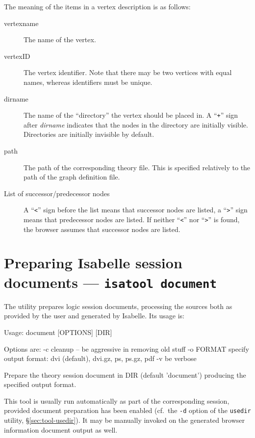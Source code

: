 The meaning of the items in a vertex description is as follows:
\begin{description}
  
\item[vertexname] The name of the vertex.
  
\item[vertexID] The vertex identifier. Note that there may be two
  vertices with equal names, whereas identifiers must be unique.
  
\item[dirname] The name of the ``directory'' the vertex should be
  placed in.  A ``{\tt +}'' sign after {\it dirname} indicates that
  the nodes in the directory are initially visible. Directories are
  initially invisible by default.
  
\item[path] The path of the corresponding theory file. This is
  specified relatively to the path of the graph definition file.
  
\item[List of successor/predecessor nodes] A ``{\tt <}'' sign before
  the list means that successor nodes are listed, a ``{\tt >}'' sign
  means that predecessor nodes are listed. If neither ``{\tt <}'' nor
  ``{\tt >}'' is found, the browser assumes that successor nodes are
  listed.

\end{description}


\section{Preparing Isabelle session documents --- \texttt{isatool document}}
\label{sec:tool-document}

The  utility prepares logic session documents, processing the
sources both as provided by the user and generated by Isabelle.  Its usage is:
\begin{ttbox}
Usage: document [OPTIONS] [DIR]

  Options are:
    -c           cleanup -- be aggressive in removing old stuff
    -o FORMAT    specify output format: dvi (default), dvi.gz, ps,
                 ps.gz, pdf
    -v           be verbose

  Prepare the theory session document in DIR (default 'document')
  producing the specified output format.
\end{ttbox}
This tool is usually run automatically as part of the corresponding session,
provided document preparation has been enabled (cf.\ the \texttt{-d} option of
the \texttt{usedir} utility, \S\ref{sec:tool-usedir}).  It may be manually
invoked on the generated browser information document output as well.

